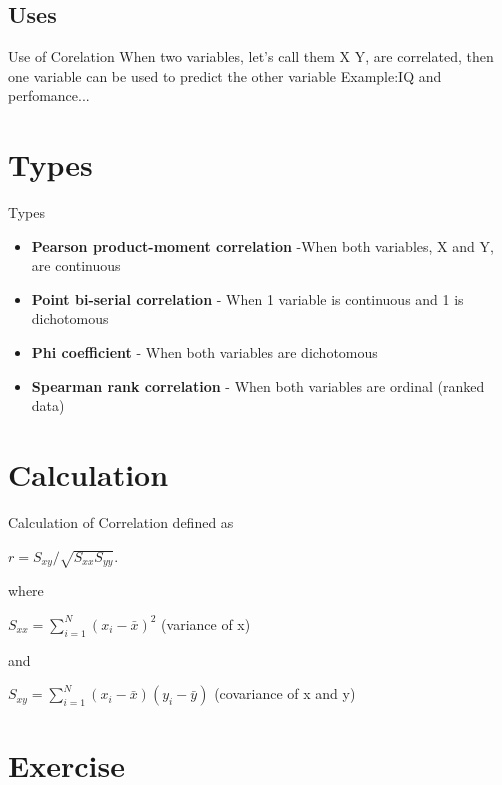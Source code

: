 \documentclass[slidestop,compress,14pt,xcolor=dvipsnames]{beamer}\usepackage[]{graphicx}\usepackage[]{color}
\begin{document}
\subsection{Uses}
\begin{frame}{Use of Corelation}
When two variables, let's call them X  Y, are correlated, then one variable can be
used to predict the other variable \newline
Example:IQ and perfomance...

\end{frame}

\section{Types}
\begin{frame}{Types}
\begin{itemize}
  \item {\bf Pearson product-moment correlation} -When both variables, X and Y, are continuous
  \item {\bf Point bi-serial correlation} - When 1 variable is continuous and 1 is dichotomous
  \item {\bf Phi coefficient} - When both variables are dichotomous
  \item {\bf Spearman rank correlation} - When both variables are ordinal (ranked data)
\end{itemize}
\end{frame}


\section{Calculation}
\begin{frame}{Calculation of Correlation}
defined as \newline 
\begin{center}
$r = S_{xy}/\sqrt{S_{xx}S_{yy}}.$ 
\end{center}
where 
\begin{center} $S_{xx} = \sum\limits_{i = 1}^N {\left( {x_i - \bar x} \right)^2}$ {(variance of x)} \end{center}
and
\begin{center} 
$S_{xy} = \sum\limits_{i = 1}^N {\left( {x_i - \bar x} \right)} {\left( {y_i - \bar y} \right)}$ {(covariance of x and y)}
\end{center}
\end{frame}


\section{Exercise}
\end{document}
